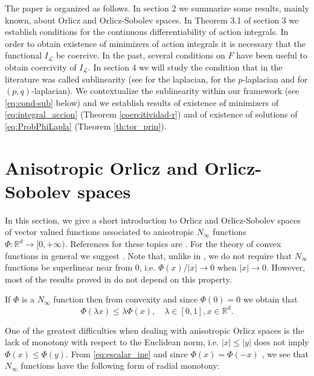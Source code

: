 \documentclass[twoside]{article}
\theoremstyle{remark}
\newcommand{\rr}{\mathbb{R}}
\renewcommand{\leq}{\leqslant}
\begin{document}
The paper is organized as follows. In section 2  we summarize some results, mainly known, about Orlicz and Orlicz-Sobolev spaces. In Theorem 3.1 of section 3 we establish conditions for the continuous differentiability of action integrals. In order to obtain existence of minimizers of action integrals it is necessary that the functional $I_{\mathcal{L}}$ be coercive. 
In the past, several conditions on $F$ have been useful to obtain coercivity of $I_{\mathcal{L}}$. 
In section 4 we will study the condition that in the literature was called sublinearity 
(see \cite{tang1998periodic,wu1999periodic,zhao2004periodic} for the laplacian, \cite{li2015infinitely,tang2010periodic} for the $p$-laplacian and \cite{li2014periodic,pasca2010periodic,pacsca2010some,yang2013existence} for $(p,q)$-laplacian).  We contextualize the sublinearity within our framework (see \eqref{eq:cond-sub} below) and we  establish results of existence of minimizers of \eqref{eq:integral_accion} (Theorem \ref{coercitividad-r}) and of existence of solutions of \eqref{eq:ProbPhiLapla} (Theorem \ref{th:tor_prin}).

\section{Anisotropic Orlicz and Orlicz-Sobolev spaces}\label{preliminares}

In this section, we give a short introduction to  Orlicz and Orlicz-Sobolev spaces of vector valued functions associated to anisotropic $N_{\infty}$ functions $\Phi:\rr^d\to[0,+\infty)$.  References for  these topics are \cite{chamra2017anisotropic,cianchi2000fully,cianchi2004optimal,Desch2001,gwiazda2013anisotropic,Orliczvectorial2005,Skaff1969,trudinger1974imbedding}. For the theory of convex functions in general we suggest \cite{clarke2013functional}. 
Note that, unlike in \cite{gwiazda2013anisotropic}, we do not require that $N_{\infty}$ functions be superlinear near from 0, i.e. $\Phi(x)/|x|\to 0$ when $|x|\to 0$. However, most of the results proved in \cite{gwiazda2013anisotropic} do not depend on this property.

If $\Phi$  is a $N_{\infty}$ function then from convexity and since $\Phi(0)=0$ we obtain that
\begin{equation}\label{eq:escalar_ine}
 \Phi(\lambda x)\leq \lambda\Phi(x),\quad \lambda\in[0,1],x\in\rr^d.
\end{equation}

One of the greatest difficulties when dealing with anisotropic Orlicz spaces is the lack of  monotony  with respect to the Euclidean norm, i.e. $|x|\leq |y|$ does not imply $\Phi(x)\leq\Phi(y)$. From \eqref{eq:escalar_ine} and since $\Phi(x)=\Phi(-x)$ , we see that  $N_{\infty}$ functions have the following form of radial monotony: 
\end{document}
